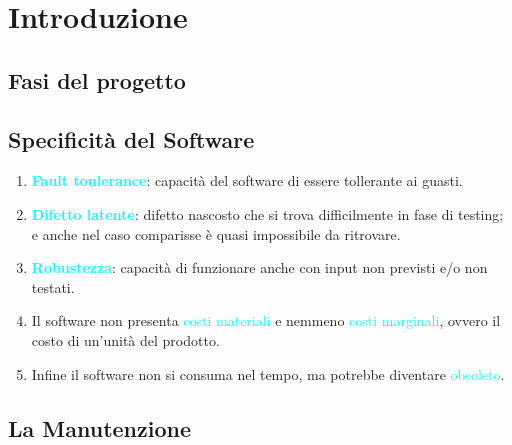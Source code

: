 \section{Introduzione}
\subsection*{Fasi del progetto}
\begin{center}
\end{center}
\subsection*{Specificità del Software}
    \begin{enumerate}
        \item \textbf{\textcolor{cyan}{Fault toulerance}}: capacità del software di essere tollerante ai guasti.
        \item \textbf{\textcolor{cyan}{Difetto latente}}: difetto nascosto che si trova difficilmente in fase di testing; e anche nel caso comparisse è quasi impossibile da ritrovare.
        \item \textbf{\textcolor{cyan}{Robustezza}}: capacità di funzionare anche con input non previsti e/o non testati.
        \item Il software non presenta \textcolor{cyan}{costi materiali} e nemmeno \textcolor{cyan}{costi marginali}, ovvero il costo di un'unità del prodotto.
        \item Infine il software non si consuma nel tempo, ma potrebbe diventare \textcolor{cyan}{obsoleto}.
    \end{enumerate}
\subsection*{La Manutenzione}
